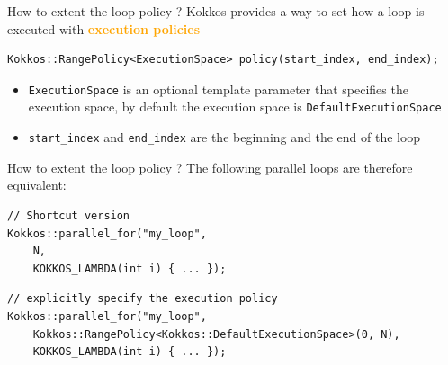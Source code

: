 \documentclass[aspectratio=169]{beamer}
\newcommand{\highlight}[1]{\textcolor{orange}{\textbf{#1}}}
\begin{document}
\begin{frame}[fragile]{How to extent the loop policy ?}
    Kokkos provides a way to set how a loop is executed with \highlight{execution policies}

    \begin{verbatim}
Kokkos::RangePolicy<ExecutionSpace> policy(start_index, end_index);
    \end{verbatim}
    \begin{itemize}
        \item \texttt{ExecutionSpace} is an optional template parameter that specifies the execution space, by default the execution space is \texttt{DefaultExecutionSpace}
        \item \texttt{start\_index} and \texttt{end\_index} are the beginning and the end of the loop
    \end{itemize}
\end{frame}


\begin{frame}[fragile]{How to extent the loop policy ?}
    The following parallel loops are therefore equivalent:

    \begin{verbatim}
// Shortcut version
Kokkos::parallel_for("my_loop",
    N,
    KOKKOS_LAMBDA(int i) { ... });
    \end{verbatim}
    \begin{verbatim}
// explicitly specify the execution policy
Kokkos::parallel_for("my_loop",
    Kokkos::RangePolicy<Kokkos::DefaultExecutionSpace>(0, N),
    KOKKOS_LAMBDA(int i) { ... });
    \end{verbatim}
\end{frame}

\end{document}
